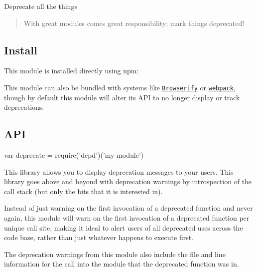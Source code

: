 \href{https://npmjs.org/package/depd}{\tt } \href{https://npmjs.org/package/depd}{\tt } \href{https://nodejs.org/en/download/}{\tt } \href{https://travis-ci.org/dougwilson/nodejs-depd}{\tt } \href{https://ci.appveyor.com/project/dougwilson/nodejs-depd}{\tt } \href{https://coveralls.io/r/dougwilson/nodejs-depd?branch=master}{\tt }

Deprecate all the things

\begin{quote}
With great modules comes great responsibility; mark things deprecated! \end{quote}


\subsection*{Install}

This module is installed directly using {\ttfamily npm}\+:




This module can also be bundled with systems like \href{http://browserify.org/}{\tt Browserify} or \href{https://webpack.github.io/}{\tt webpack}, though by default this module will alter it\textquotesingle{}s A\+PI to no longer display or track deprecations.

\subsection*{A\+PI}


\begin{DoxyCode}
var deprecate = require('depd')('my-module')
\end{DoxyCode}


This library allows you to display deprecation messages to your users. This library goes above and beyond with deprecation warnings by introspection of the call stack (but only the bits that it is interested in).

Instead of just warning on the first invocation of a deprecated function and never again, this module will warn on the first invocation of a deprecated function per unique call site, making it ideal to alert users of all deprecated uses across the code base, rather than just whatever happens to execute first.

The deprecation warnings from this module also include the file and line information for the call into the module that the deprecated function was in.

